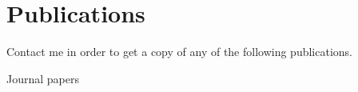 \documentclass[10pt,a4paper,sans]{moderncv} %
\begin{document}

        
        


\section{Publications}

Contact me in order to get a copy of any of the following publications.

{\large \textcolor{color1}{Journal papers}}
\end{document}
